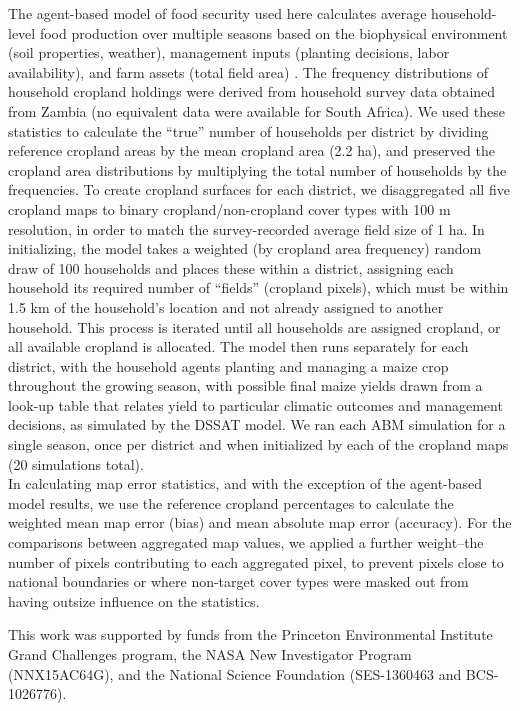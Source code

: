 \documentclass{pnastwo2}
\begin{document}
\begin{article}
\begin{materials}
\indent The agent-based model of food security used here calculates average household-level food production over multiple seasons based on the biophysical environment (soil properties, weather), management inputs (planting decisions, labor availability), and farm assets (total field area) \cite{chen_dependency_2013}. The frequency distributions of household cropland holdings were derived from household survey data obtained from Zambia (no equivalent data were available for South Africa). We used these statistics to calculate the ``true'' number of households per district by dividing reference cropland areas by the mean cropland area (2.2 ha), and preserved the cropland area distributions by multiplying the total number of households by the frequencies. To create cropland surfaces for each district, we disaggregated all five cropland maps to binary cropland/non-cropland cover types with 100 m resolution, in order to match the survey-recorded average field size of 1 ha. In initializing, the model takes a weighted (by cropland area frequency) random draw of 100 households and places these within a district, assigning each household its required number of ``fields'' (cropland pixels), which must be within 1.5 km of the household's location and not already assigned to another household. This process is iterated until all households are assigned cropland, or all available cropland is allocated. The model then runs separately for each district, with the household agents planting and managing a maize crop throughout the growing season, with possible final maize yields drawn from a look-up table that relates yield to particular climatic outcomes and management decisions, as simulated by the DSSAT model. We ran each ABM simulation for a single season, once per district and when initialized by each of the cropland maps (20 simulations total).\\
\indent In calculating map error statistics, and with the exception of the agent-based model results, we use the reference cropland percentages to calculate the weighted mean map error (bias) and mean absolute map error (accuracy). For the comparisons between aggregated map values, we applied a further weight--the number of pixels contributing to each aggregated pixel, to prevent pixels close to national boundaries or where non-target cover types were masked out from having outsize influence on the statistics. 

\end{materials}



\begin{acknowledgments}
This work was supported by funds from the Princeton Environmental Institute Grand Challenges program, the NASA New Investigator Program
(NNX15AC64G), and the National Science Foundation (SES-1360463 and BCS-1026776).
\end{acknowledgments}


 
{\footnotesize }

\end{article}
\end{document}
